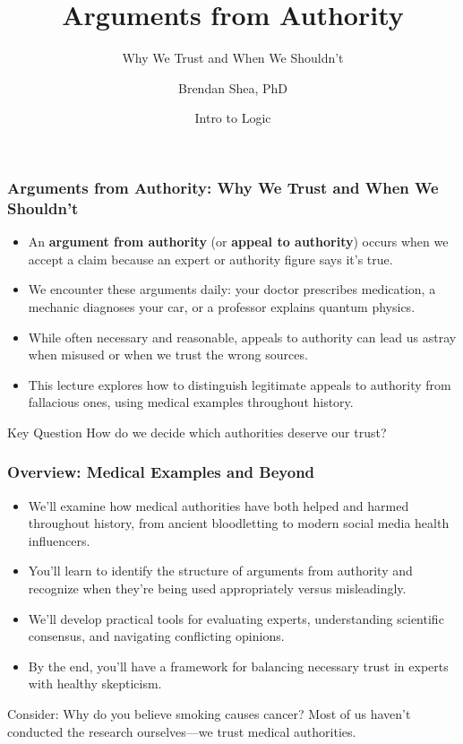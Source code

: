 \documentclass{beamer}
\title{Arguments from Authority}
\subtitle{Why We Trust and When We Shouldn't}
\author{Brendan Shea, PhD}
\date{Intro to Logic}
\begin{document}
	
	\frame{\titlepage}
	
	\begin{frame}
		\frametitle{Arguments from Authority: Why We Trust and When We Shouldn't}
		\begin{itemize}
			\item An \textbf{argument from authority} (or \textbf{appeal to authority}) occurs when we accept a claim because an expert or authority figure says it's true.
			\item We encounter these arguments daily: your doctor prescribes medication, a mechanic diagnoses your car, or a professor explains quantum physics.
			\item While often necessary and reasonable, appeals to authority can lead us astray when misused or when we trust the wrong sources.
			\item This lecture explores how to distinguish legitimate appeals to authority from fallacious ones, using medical examples throughout history.
		\end{itemize}
		
		\begin{alertblock}{Key Question}
			How do we decide which authorities deserve our trust?
		\end{alertblock}
	\end{frame}
	
	\begin{frame}
		\frametitle{Overview: Medical Examples and Beyond}
		\begin{itemize}
			\item We'll examine how medical authorities have both helped and harmed throughout history, from ancient bloodletting to modern social media health influencers.
			\item You'll learn to identify the structure of arguments from authority and recognize when they're being used appropriately versus misleadingly.
			\item We'll develop practical tools for evaluating experts, understanding scientific consensus, and navigating conflicting opinions.
			\item By the end, you'll have a framework for balancing necessary trust in experts with healthy skepticism.
		\end{itemize}
		
		\begin{example}
			Consider: Why do you believe smoking causes cancer? Most of us haven't conducted the research ourselves—we trust medical authorities.
		\end{example}
	\end{frame}
	
\end{document}
